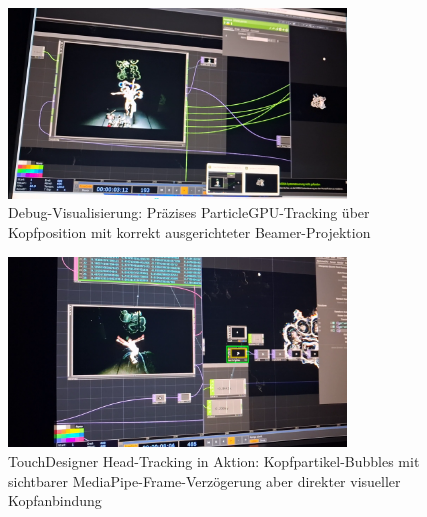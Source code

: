 \begin{figure}[htbp]
    \centering
    \includegraphics[width=0.8\textwidth,height=0.4\textheight,keepaspectratio]{images/HeadTrackingPerspectiveTouchDesignerWithVisualsOverlayedAboveDebugCompToSeeaccurateTrackingOfParticleGPUaboveHeadWithReallifeBeamerProjectionCorrectlyPlaced.png}
    \caption{Debug-Visualisierung: Präzises ParticleGPU-Tracking über Kopfposition mit korrekt ausgerichteter Beamer-Projektion}
    \label{fig:headtracking_debug_overlay}
\end{figure}

\begin{figure}[htbp]
    \centering
    \includegraphics[width=0.8\textwidth,height=0.4\textheight,keepaspectratio]{images/HeadTrackedBubblesInActionTouchDesignerPerspectiveslightMediaPipeFrameDelaySeeableButAlsoVisualsDirectlyAtHead.png}
    \caption{TouchDesigner Head-Tracking in Aktion: Kopfpartikel-Bubbles mit sichtbarer MediaPipe-Frame-Verzögerung aber direkter visueller Kopfanbindung}
    \label{fig:headtracking_bubbles_aktion}
\end{figure}


